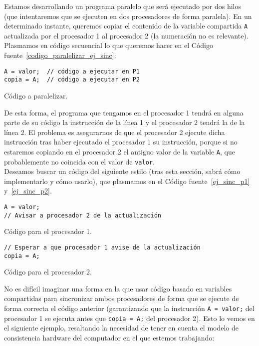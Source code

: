 \begin{ejemplo}
    Estamos desarrollando un programa paralelo que será ejecutado por dos hilos (que intentaremos que se ejecuten en dos procesadores de forma paralela). En un determinado instante, queremos copiar el contenido de la variable compartida \verb|A| actualizada por el procesador 1 al procesador 2 (la numeración no es relevante). Plasmamos en código secuencial lo que queremos hacer en el Código fuente~\ref{codigo_paralelizar_ej_sinc}:
\begin{listing}[H]
\centering
\begin{verbatim}
A = valor;  // código a ejecutar en P1
copia = A;  // código a ejecutar en P2
\end{verbatim}
\caption{Código a paralelizar.}
\label{codigo_paralelizar_ej_sinc}
\end{listing}
De esta forma, el programa que tengamos en el procesador 1 tendrá en alguna parte de su código la instrucción de la línea 1 y el procesador 2 tendrá la de la línea 2. El problema es asegurarnos de que el procesador 2 ejecute dicha instrucción tras haber ejecutado el procesador 1 su instrucción, porque si no estaremos copiando en el procesador 2 el antiguo valor de la variable \verb|A|, que probablemente no coincida con el valor de \verb|valor|.\\

Deseamos buscar un código del siguiente estilo (tras esta sección, sabrá cómo implementarlo y cómo usarlo), que plasmamos en el Código fuente~\ref{ej_sinc_p1} y~\ref{ej_sinc_p2}.
\begin{listing}[H]
\centering
\begin{verbatim}
A = valor;
// Avisar a procesador 2 de la actualización
\end{verbatim}
\caption{Código para el procesador 1.}
\label{ej_sinc_p1}
\end{listing}

\begin{listing}[H]
\centering
\begin{verbatim}
// Esperar a que procesador 1 avise de la actualización
copia = A;
\end{verbatim}
\caption{Código para el procesador 2.}
\label{ej_sinc_p2}
\end{listing}
\end{ejemplo}
No es difícil imaginar una forma en la que usar código basado en variables compartidas para sincronizar ambos procesadores de forma que se ejecute de forma correcta el código anterior (garantizando que la instrucción \verb|A = valor;| del procesador 1 se ejecuta antes que \verb|copia = A;| del procesador 2). Esto lo vemos en el siguiente ejemplo, resaltando la necesidad de tener en cuenta el modelo de consistencia hardware del computador en el que estemos trabajando:
